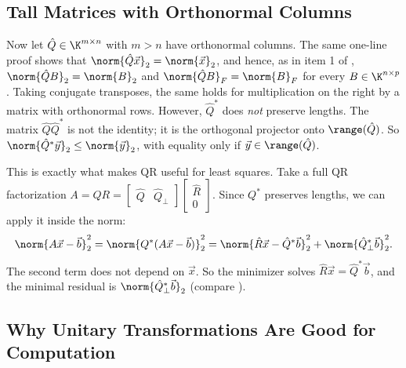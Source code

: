 \subsection{Tall Matrices with Orthonormal Columns}

Now let $\hat{Q} \in \K^{m \times n}$ with $m > n$ have orthonormal columns. The same one-line proof shows that $\norm{\hat{Q}\vec{x}}_2 = \norm{\vec{x}}_2$, and hence, as in item 1 of , $\norm{\hat{Q}B}_2 = \norm{B}_2$ and $\norm{\hat{Q}B}_F = \norm{B}_F$ for every $B \in \K^{n \times p}$. Taking conjugate transposes, the same holds for multiplication on the right by a matrix with orthonormal rows. However, $\hat{Q}^\ast$ does \emph{not} preserve lengths. The matrix $\hat{Q}\hat{Q}^\ast$ is not the identity; it is the orthogonal projector onto $\range(\hat{Q})$. So $\norm{\hat{Q}^\ast\vec{y}}_2 \le \norm{\vec{y}}_2$, with equality only if $\vec{y} \in \range(\hat{Q})$.

This is exactly what makes QR useful for least squares. Take a full QR factorization $A = QR = \begin{bmatrix} \hat{Q} & \hat{Q}_\perp \end{bmatrix}\begin{bmatrix} \hat{R} \\ 0 \end{bmatrix}$. Since $Q^\ast$ preserves lengths, we can apply it inside the norm:
\begin{equation}
  \norm{A\vec{x} - \vec{b}}_2^2 = \norm{Q^\ast(A\vec{x} - \vec{b})}_2^2 = \norm{\hat{R}\vec{x} - \hat{Q}^\ast\vec{b}}_2^2 + \norm{\hat{Q}_\perp^\ast\vec{b}}_2^2.
\end{equation}
The second term does not depend on $\vec{x}$. So the minimizer solves $\hat{R}\vec{x} = \hat{Q}^\ast\vec{b}$, and the minimal residual is $\norm{\hat{Q}_\perp^\ast\vec{b}}_2$ (compare ).

\subsection{Why Unitary Transformations Are Good for Computation}

